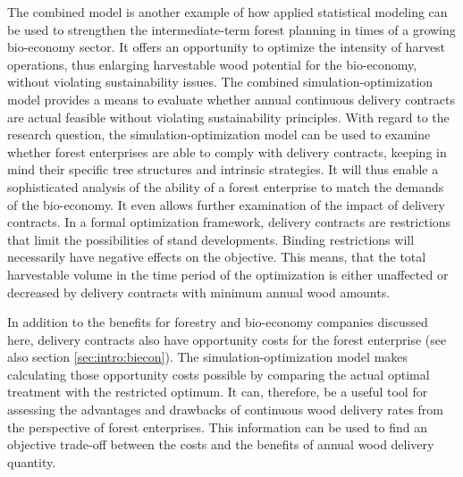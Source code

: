 The combined model is another example of how applied statistical modeling can be used to strengthen the intermediate-term forest planning in times of a growing bio-economy sector. It offers an opportunity to optimize the intensity of harvest operations, thus enlarging harvestable wood potential for the bio-economy, without violating sustainability issues. The combined simulation-optimization model provides a means to evaluate whether annual continuous delivery contracts are actual feasible without violating sustainability principles. With regard to the research question, the simulation-optimization model can be used to examine whether forest enterprises are able to comply with delivery contracts, keeping in mind their specific tree structures and intrinsic strategies. It will thus enable a sophisticated analysis of the ability of a forest enterprise to match the demands of the bio-economy. It even allows further examination of the impact of delivery contracts. In a formal optimization framework, delivery contracts are restrictions that limit the possibilities of stand developments. Binding restrictions will necessarily have negative effects on the objective. This means, that the total harvestable volume in the time period of the optimization is either unaffected or decreased by delivery contracts with minimum annual wood amounts.

In addition to the benefits for forestry and bio-economy companies discussed here, delivery contracts also have opportunity costs for the forest enterprise (see also section \ref{sec:intro:biecon}). The simulation-optimization model makes calculating those opportunity costs possible by comparing the actual optimal treatment with the restricted optimum. It can, therefore, be a useful tool for assessing the advantages and drawbacks of continuous wood delivery rates from the perspective of forest enterprises. This information can be used to find an objective trade-off between the costs and the benefits of annual wood delivery quantity.